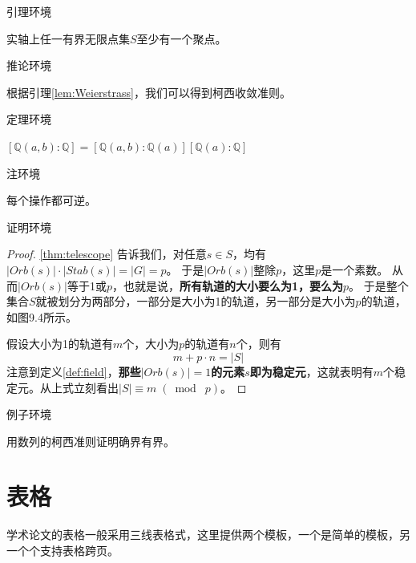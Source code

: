 引理环境
\begin{lemma}\rm{\cite{Azizov2003On}}\label{lem:Weierstrass}
	实轴上任一有界无限点集$S$至少有一个聚点。
\end{lemma}

推论环境
\begin{corollary}
	根据引理\ref{lem:Weierstrass}，我们可以得到柯西收敛准则。
\end{corollary}

定理环境
\begin{theorem}[望远镜公式]\label{thm:telescope}
	$\left[\mathbb{Q}(a, b) : \mathbb{Q}\right]=\left[\mathbb{Q}(a, b) : \mathbb{Q}(a)\right]\left[\mathbb{Q}(a) : \mathbb{Q}\right] $
\end{theorem}

注环境
\begin{remark}\label{rem:reversible}
	每个操作都可逆。
\end{remark}

证明环境
\begin{proof}
	\autoref{thm:telescope} 告诉我们，对任意$s\in S$，均有$\lvert Orb(s)\rvert \cdot \lvert Stab(s)\rvert=\lvert G\rvert=p$。 于是$\lvert Orb(s)\rvert $整除$p$，这里$p$是一个素数。
	从而$\lvert Orb(s)\rvert $等于1或$p$，也就是说，\textbf{所有轨道的大小要么为1，要么为$p$}。
	于是整个集合$S$就被划分为两部分，一部分是大小为1的轨道，另一部分是大小为$p$的轨道，如图9.4所示。
	
	假设大小为1的轨道有$m$个，大小为$p$的轨道有$n$个，则有
	\begin{equation}
		m+p\cdot n=\lvert S\rvert 
	\end{equation}
	注意到定义\ref{def:field}，\textbf{那些$\lvert Orb(s)\rvert =1$的元素$s$即为稳定元}，这就表明有$m$个稳定元。从上式立刻看出$\lvert S \rvert \equiv  m\; (\bmod\; p)$。
\end{proof}
 

例子环境
\begin{example}
	用数列的柯西准则证明确界有界。
\end{example}

\section{表格}
学术论文的表格一般采用三线表格式，这里提供两个模板，一个是简单的模板，另一个个支持表格跨页。

